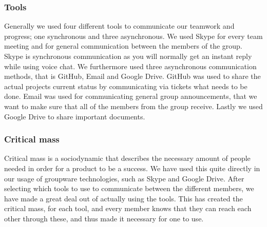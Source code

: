 \subsubsection{Tools} \label{subsubsec:tools}
Generally we used four different tools to communicate our teamwork and progress; one synchronous and three asynchronous. We used Skype for every team meeting and for general communication between the members of the group. Skype is synchronous communication as you will normally get an instant reply while using voice chat. We furthermore used three asynchronous communication methods, that is GitHub, Email and Google Drive. GitHub was used to share the actual projects current status by communicating via tickets what needs to be done. Email was used for communicating general group announcements, that we want to make sure that all of the members from the group receive. Lastly we used Google Drive to share important documents.  

\subsubsection{Critical mass} \label{subsubsec:criticalmass}

Critical mass \cite{grudin1994groupware} is a sociodynamic that describes the necessary amount of people needed in order for a product to be a success. We have used this quite directly in our usage of groupware technologies, such as Skype and Google Drive. After selecting which tools to use to communicate between the different members, we have made a great deal out of actually using the tools. This has created the critical mass, for each tool, and every member knows that they can reach each other through these, and thus made it necessary for one to use.

